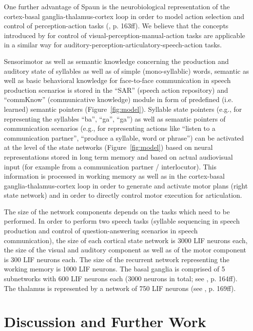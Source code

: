 \documentclass[conference]{IEEEtran}
\begin{document}
One further advantage of Spaun is the neurobiological representation
of the cortex-basal ganglia-thalamus-cortex loop in order to model
action selection and control of perception-action tasks
(\cite{eliasmith2013}, p. 163ff). We believe that the concepts
introduced by \cite{eliasmith2013} for control of
visual-perception-manual-action tasks are applicable in a similar way
for auditory-perception-articulatory-speech-action tasks.

Sensorimotor as well as semantic knowledge concerning the production
and auditory state of syllables as well as of simple (mono-syllablic)
words, semantic as well as basic behavioral knowledge for face-to-face
communication in speech production scenarios is stored in the ``SAR''
(speech action repository) and ``commKnow'' (communicative knowledge)
module in form of predefined (i.e. learned) semantic pointers
(Figure~\ref{fig:model}).
Syllable state pointers (e.g., for representing the syllables
``ba'', ``ga'', ``ga'') as well as semantic pointers of
communication scenarios (e.g., for representing actions like
``listen to a communication partner'', ``produce a syllable, word or
phrase'') can be activated at the level of the state networks
(Figure~\ref{fig:model})
based on neural representations stored in long term memory
and based on actual audiovisual input (for example from a
communication partner / interlocutor).
This information is processed
in working memory as well as in the
cortex-basal ganglia-thalamus-cortex loop in order to generate and
activate motor plans (right state network) and in order to directly
control motor execution for articulation.

The size of the network components depends on the tasks which need to
be performed. In order to perform two speech tasks
(syllable sequencing in speech production and control of
question-answering scenarios in speech communication),
the size of each cortical state network is 3000 LIF neurons each,
the size of the visual and auditory component
as well as of the motor component is
300 LIF neurons each. The size of the recurrent network representing
the working memory is 1000 LIF neurons. The basal ganglia is comprised of
5 subnetworks with 600 LIF neurons each (3000 neurons in
total; see \cite{eliasmith2013}, p. 164ff). The thalamus is
represented by a network of 750 LIF neurons (see
\cite{eliasmith2013}, p. 169ff).

\section{Discussion and Further Work}
\end{document}
